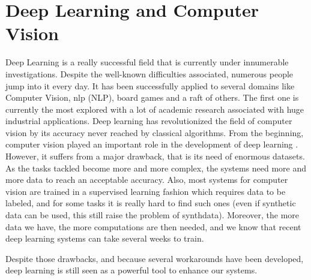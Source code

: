 \documentclass[12pt, a4paper]{report}
\begin{document}
		\section{Deep Learning and Computer Vision}
			Deep Learning is a really successful field that is currently under innumerable investigations.
			Despite the well-known difficulties associated, numerous people jump into it every day.
			It has been successfully applied to several domains like Computer Vision, \gls{nlp} (NLP), board games and a raft of others.
			The first one is currently the most explored with a lot of academic research associated with huge industrial applications.
			Deep learning has revolutionized the field of computer vision by its accuracy never reached by classical algorithms.
			From the beginning, computer vision played an important role in the development of deep learning \cite{lecun1989backpropagation,lecun1998gradient,fukushima1981neocognitron}.
			However, it suffers from a major drawback, that is its need of enormous datasets.
			As the tasks tackled become more and more complex, the systems need more and more data to reach an acceptable accuracy.
			Also, most systems for computer vision are trained in a supervised learning fashion which requires data to be labeled, and for some tasks it is really hard to find such ones (even if synthetic data can be used, this still raise the problem of \gls{synthdata}).
			Moreover, the more data we have, the more computations are then needed, and we know that recent deep learning systems can take several weeks to train.
			\par
			Despite those drawbacks, and because several workarounds have been developed, deep learning is still seen as a powerful tool to enhance our systems.
\end{document}
